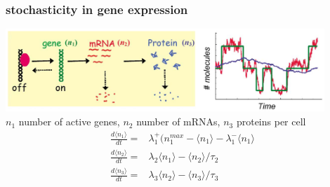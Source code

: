 \begin{frame}
\frametitle{stochasticity in gene expression}
\begin{center}
\includegraphics[width=0.9\textwidth]{fig/stochgeneexpdyn.png}\\
{\scriptsize
$n_1$ number of active genes, $n_2$ number of mRNAs, $n_3$ proteins per cell
\begin{align*}
\frac{d \langle n_1 \rangle}{dt} = &\lambda_1^+ (n_1^{max}-\langle n_1 \rangle -\lambda_1^- \langle n_1 \rangle\\
\frac{d \langle n_2 \rangle}{dt} = &\lambda_2 \langle n_1 \rangle -\langle n_2 \rangle / \tau_2\\
\frac{d \langle n_3 \rangle}{dt} = &\lambda_3 \langle n_2 \rangle - \langle n_3 \rangle / \tau_3
\end{align*}}
\end{center}
\end{frame}
